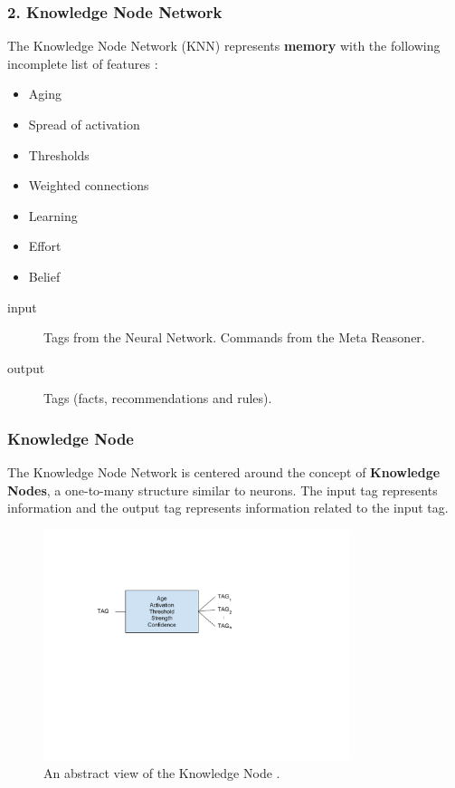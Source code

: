 \documentclass{beamer}
\begin{document}
	\begin{frame}
		\frametitle{2. Knowledge Node Network}
		The Knowledge Node Network (KNN) represents \textbf{memory} with the following incomplete list of features :
		\begin{itemize}
			\item Aging
			\item Spread of activation
			\item Thresholds
			\item Weighted connections
			\item Learning
			\item Effort
			\item Belief
		\end{itemize}
	
		\begin{description}
			\item[input] 
				Tags from the Neural Network. \linebreak
				Commands from the Meta Reasoner.
			\item[output] Tags (facts, recommendations and rules).
		\end{description}
	
	\end{frame}

	\begin{frame}
		\frametitle{Knowledge Node}
		The Knowledge Node Network is centered around the concept of \textbf{Knowledge Nodes}, a one-to-many structure similar to neurons. The input tag represents information and the output tag represents information related to the input tag.
		\begin{figure}
			\centering
			\includegraphics[width=0.8\textwidth]{figures/kn.pdf}
			\caption
			{An abstract view of the Knowledge Node \footfullcite{vybihal-model}.}
			\label{fig:kn}
		\end{figure}
	\end{frame}
\end{document}

